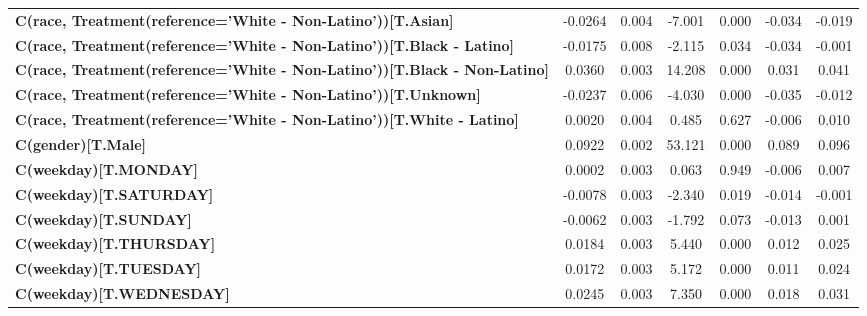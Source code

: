 \begin{center}
\begin{tabular}{lcccccc}
\textbf{C(race, Treatment(reference='White - Non-Latino'))[T.Asian]}              &      -0.0264  &        0.004     &    -7.001  &         0.000        &       -0.034    &       -0.019     \\
\textbf{C(race, Treatment(reference='White - Non-Latino'))[T.Black - Latino]}     &      -0.0175  &        0.008     &    -2.115  &         0.034        &       -0.034    &       -0.001     \\
\textbf{C(race, Treatment(reference='White - Non-Latino'))[T.Black - Non-Latino]} &       0.0360  &        0.003     &    14.208  &         0.000        &        0.031    &        0.041     \\
\textbf{C(race, Treatment(reference='White - Non-Latino'))[T.Unknown]}            &      -0.0237  &        0.006     &    -4.030  &         0.000        &       -0.035    &       -0.012     \\
\textbf{C(race, Treatment(reference='White - Non-Latino'))[T.White - Latino]}     &       0.0020  &        0.004     &     0.485  &         0.627        &       -0.006    &        0.010     \\
\textbf{C(gender)[T.Male]}                                                        &       0.0922  &        0.002     &    53.121  &         0.000        &        0.089    &        0.096     \\
\textbf{C(weekday)[T.MONDAY]}                                                     &       0.0002  &        0.003     &     0.063  &         0.949        &       -0.006    &        0.007     \\
\textbf{C(weekday)[T.SATURDAY]}                                                   &      -0.0078  &        0.003     &    -2.340  &         0.019        &       -0.014    &       -0.001     \\
\textbf{C(weekday)[T.SUNDAY]}                                                     &      -0.0062  &        0.003     &    -1.792  &         0.073        &       -0.013    &        0.001     \\
\textbf{C(weekday)[T.THURSDAY]}                                                   &       0.0184  &        0.003     &     5.440  &         0.000        &        0.012    &        0.025     \\
\textbf{C(weekday)[T.TUESDAY]}                                                    &       0.0172  &        0.003     &     5.172  &         0.000        &        0.011    &        0.024     \\
\textbf{C(weekday)[T.WEDNESDAY]}                                                  &       0.0245  &        0.003     &     7.350  &         0.000        &        0.018    &        0.031     \\

\end{tabular}
\end{center}
